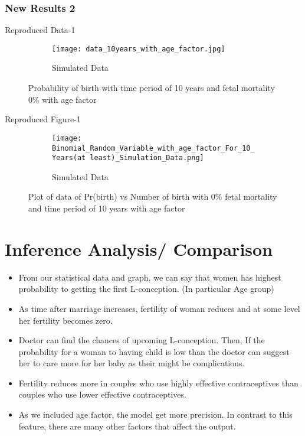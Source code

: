 \documentclass{article}
\begin{document}
\subsubsection{New Results 2}
\item Reproduced Data-1\\
\begin{figure}[htp]
\centering
\begin{subfigure}{.8\textwidth}
  \centering
  \texttt{[image: data\_10years\_with\_age\_factor.jpg]}
  \caption{Simulated Data}
  \label{fig:sub1}
\end{subfigure}%
\caption{Probability of birth with time period of 10 years and fetal mortality 0\% with age factor}
\label{fig:test}
\end{figure}

\item Reproduced Figure-1\\

\begin{figure}[htp]
\centering
\begin{subfigure}{.8\textwidth}
  \centering
  \texttt{[image: Binomial\_Random\_Variable\_with\_age\_factor\_For\_10\_Years(at least)\_Simulation\_Data.png]}
  \caption{Simulated Data}
  \label{fig:sub1}
\end{subfigure}%
\caption{Plot of data of Pr(birth) vs Number of birth with 0\% fetal mortality and time period of 10 years with age factor}
\label{fig:test}
\end{figure}
\newpage
\section{Inference Analysis/ Comparison}
	
\begin{itemize}

\item From our statistical data and graph, we can say that women has highest probability to getting the first L-conception. (In particular Age group)
	
\item As time after marriage increases, fertility of woman reduces and at some level her fertility becomes zero.

\item Doctor can find the chances of upcoming L-conception. Then, If the probability for a woman to having child is low than the doctor can suggest her to care more for her baby as their might be complications. 

\item Fertility reduces more in couples who use highly effective contraceptives than couples who use lower effective contraceptives.

\item As we included age factor, the model get more precision. In contrast to this feature, there are many other factors that affect the output.

\end{itemize} 
\end{document}
